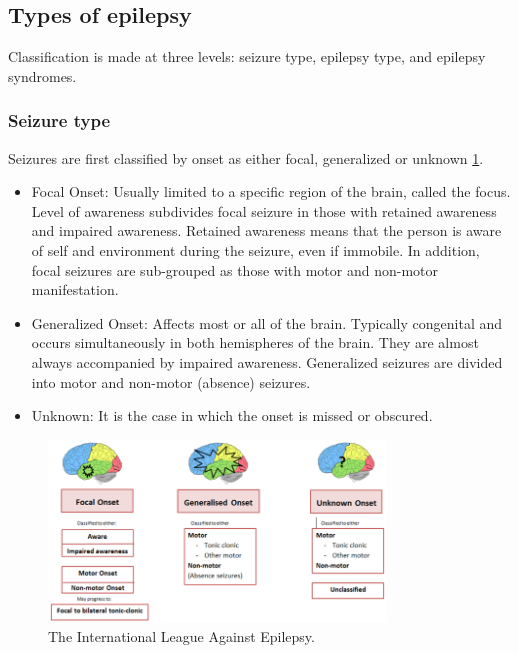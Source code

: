   \subsection*{Types of epilepsy}
  Classification is made at three levels: seizure type, epilepsy type, and epilepsy syndromes. \cite{classification}
    \subsubsection*{Seizure type}
    Seizures are first classified by onset as either focal, generalized or unknown \ref{fig:Classification of epileptic seizures}.
    \begin{itemize}
      \item Focal Onset: Usually limited to a specific region of the brain, called the focus. Level of awareness subdivides focal seizure in those with retained awareness and impaired awareness. Retained awareness means that the person is aware of self and environment during the seizure, even if immobile. In addition, focal seizures are sub-grouped as those with motor and non-motor manifestation.
      \item Generalized Onset: Affects most or all of the brain. Typically congenital and occurs simultaneously in both hemispheres of the brain. They are almost always accompanied by impaired awareness. Generalized seizures are divided into motor and non-motor (absence) seizures.
      \item Unknown: It is the case in which the onset is missed or obscured. 
    \end{itemize}

    \begin{figure}[h]
      \centering
      \includegraphics[width=0.8\textwidth]{images/seizureTypes.png}
      \caption{The International League Against Epilepsy.\cite{Scheffer2017}}
      \label{fig:Classification of epileptic seizures}
    \end{figure}
  
